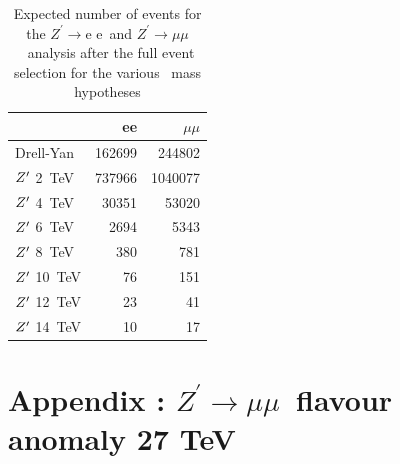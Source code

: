 \documentclass{cernrep}
\newcommand*{\Zpee}{\ensuremath{Z^{\prime}\rightarrow \text{e e}}}
\newcommand*{\Zpmumu}{\ensuremath{Z^{\prime}\rightarrow \mu\mu}}
\begin{document}
\begin{table}[!htb]
   \centering
\begin{tabular}{|l|r|r|}
  \hline
  \hline
 & ee & $\mu\mu$  \\
  \hline
  Drell-Yan    & 162699 &  244802 \\
  \hline
  $Z^{\prime}$ 2~TeV  & 737966 & 1040077 \\
  $Z^{\prime}$ 4~TeV  &  30351 &   53020 \\
  $Z^{\prime}$ 6~TeV  &   2694 &    5343 \\
  $Z^{\prime}$ 8~TeV  &    380 &     781 \\
  $Z^{\prime}$ 10~TeV &     76 &     151 \\
  $Z^{\prime}$ 12~TeV &     23 &      41 \\
  $Z^{\prime}$ 14~TeV &     10 &      17 \\
  \hline
  \hline
\end{tabular}
  \caption{Expected number of events for the \Zpee\ and \Zpmumu\ analysis after the full event selection for the various \Zp\ mass hypotheses}
  \label{tab:leptonicresonances27:yieldsll}
\end{table}

\clearpage
\newpage

\section{Appendix : \Zpmumu\ flavour anomaly 27 TeV}
\label{appendix:zpmumufalvano27}
\end{document}

